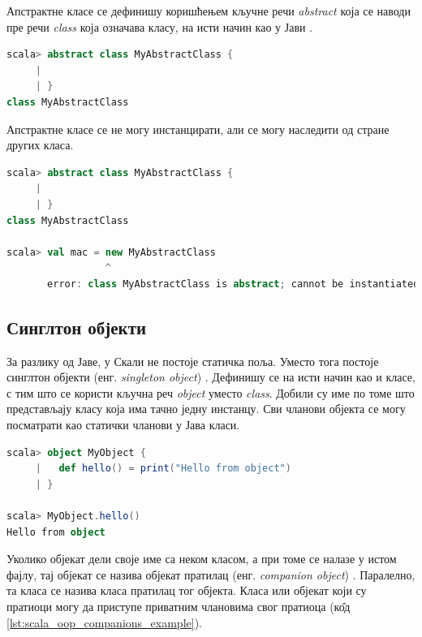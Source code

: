\documentclass[12pt,oneside]{memoir}
\begin{document}
Апстрактне класе се дефинишу коришћењем кључне речи \textit{abstract} која се наводи пре речи \textit{class} која означава класу, на исти начин као у Јави \cite{scala_prog}.

\begin{lstlisting}[language=Scala, caption={Апстрактна класа у Скали}, label={lst:scala_oop_abstract_class_example}]
scala> abstract class MyAbstractClass {
     | 
     | }
class MyAbstractClass
\end{lstlisting}

\noindent Апстрактне класе се не могу инстанцирати, али се могу наследити од стране других класа.

\begin{lstlisting}[language=Scala, caption={Инстанцирање апстрактне класе}, label={lst:scala_oop_abstract_class_instance_example}]
scala> abstract class MyAbstractClass {
     | 
     | }
class MyAbstractClass

scala> val mac = new MyAbstractClass
                 ^
       error: class MyAbstractClass is abstract; cannot be instantiated
\end{lstlisting}

\subsection{Синглтон објекти}
\label{subsec:scala_sing_obj}

За разлику од Јаве, у Скали не постоје статичка поља. Уместо тога постоје синглтон објекти (енг. \textit{singleton object}) \cite{scala_prog}. Дефинишу се на исти начин као и класе, с тим што се користи кључна реч \textit{object} уместо \textit{class}. Добили су име по томе што представљају класу која има тачно једну инстанцу. Сви чланови објекта се могу посматрати као статички чланови у Јава класи.

\begin{lstlisting}[language=Scala, caption={Коришћење синглтон објекта}, label={lst:scala_oop_object_example}]
scala> object MyObject {
     |   def hello() = print("Hello from object")
     | }

scala> MyObject.hello()
Hello from object
\end{lstlisting}

Уколико објекат дели своје име са неком класом, а при томе се налазе у истом фајлу, тај објекат се назива објекат пратилац (енг. \textit{companion object}) \cite{scala_prog}. Паралелно, та класа се назива класа пратилац тог објекта. Класа или објекат који су пратиоци могу да приступе приватним члановима свог пратиоца (к\^ {о}д \ref{lst:scala_oop_companions_example}).
\end{document}
